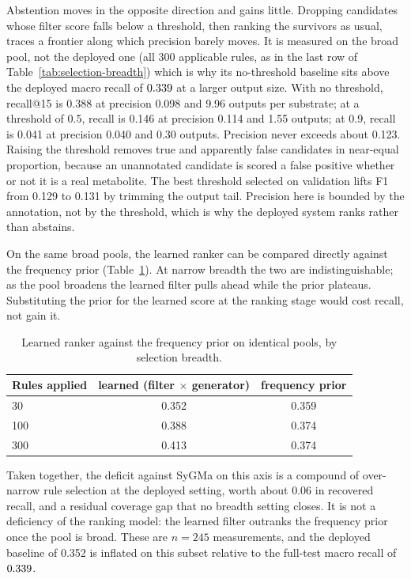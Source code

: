 Abstention moves in the opposite direction and gains little. Dropping candidates whose filter
score falls below a threshold, then ranking the survivors as usual, traces a frontier along which
precision barely moves. It is measured on the broad pool, not the deployed one (all $300$
applicable rules, as in the last row of Table~\ref{tab:selection-breadth}) which is why its
no-threshold baseline sits above the deployed macro recall of $0.339$ at a larger output size.
With no threshold, recall@15 is 0.388 at precision 0.098 and 9.96 outputs
per substrate; at a threshold of 0.5, recall is 0.146 at precision 0.114 and 1.55 outputs; at 0.9,
recall is 0.041 at precision 0.040 and 0.30 outputs. Precision never exceeds about 0.123. Raising the
threshold removes true and apparently false candidates in near-equal proportion, because an
unannotated candidate is scored a false positive whether or not it is a real metabolite. The best
threshold selected on
validation lifts F1 from 0.129 to 0.131 by trimming the output tail. Precision here is bounded
by the annotation, not by the threshold, which is why the deployed system ranks rather than
abstains.

On the same broad pools, the learned ranker can be compared directly against the frequency prior
(Table~\ref{tab:ranker-vs-prior}). At narrow breadth the two are indistinguishable; as the pool
broadens the learned filter pulls ahead while the prior plateaus. Substituting the prior for the
learned score at the ranking stage would cost recall, not gain it.

\begin{table}[h]
\centering
\begin{tabular}{lcc}
\toprule
Rules applied & learned (filter $\times$ generator) & frequency prior \\
\midrule
30 & 0.352 & 0.359 \\
100 & 0.388 & 0.374 \\
300 & 0.413 & 0.374 \\
\bottomrule
\end{tabular}
\caption{Learned ranker against the frequency prior on identical pools, by selection breadth.}
\label{tab:ranker-vs-prior}
\end{table}

Taken together, the deficit against SyGMa on this axis is a compound of over-narrow rule
selection at the deployed setting, worth about 0.06 in recovered recall, and a residual coverage
gap that no breadth setting closes. It is not a deficiency of the ranking model: the learned
filter outranks the frequency prior once the pool is broad. These are $n=245$ measurements, and
the deployed baseline of 0.352 is inflated on this subset relative to the full-test macro recall
of $0.339$.


